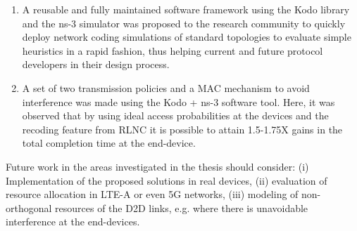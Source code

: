 \begin{enumerate}
\item A reusable and fully maintained software framework using the Kodo library and the ns-3 simulator was proposed to the research community to quickly deploy network coding simulations of standard topologies to evaluate simple heuristics in a rapid fashion, thus helping current and future protocol developers in their design process.

\item A set of two transmission policies and a \ac{MAC} mechanism to avoid interference was made using the Kodo + ns-3 software tool. Here, it was observed that by using ideal access probabilities at the devices and the recoding feature from \ac{RLNC} it is possible to attain 1.5-1.75X gains in the total completion time at the end-device.

\end{enumerate}

Future work in the areas investigated in the thesis should consider: (i) Implementation of the proposed solutions in real devices, (ii) evaluation of resource allocation in \ac{LTE-A} or even 5G networks, (iii) modeling of non-orthogonal resources of the \ac{D2D} links, e.g. where there is unavoidable interference at the end-devices.

